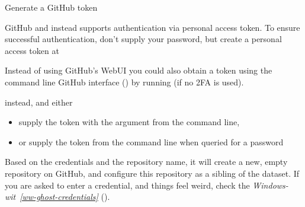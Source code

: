 \ignorespaces \begin{importantnote}[label={index-13}, before title={\thetcbcounter\ }, check odd page=true]{Generate a GitHub token}
\label{\detokenize{basics/101-130-yodaproject:index-13}}

\sphinxAtStartPar
GitHub  and instead supports authentication via personal access token.
To ensure successful authentication, don’t supply your password, but create a personal access token at %
\begin{footnote}\sphinxAtStartFootnote
Instead of using GitHub’s WebUI you could also obtain a token using the command line GitHub interface () by running  (if no 2FA is used).
%
\end{footnote} instead, and either
\begin{itemize}
\item {} 
\sphinxAtStartPar
supply the token with the argument  from the command line,

\item {} 
\sphinxAtStartPar
or supply the token from the command line when queried for a password

\end{itemize}


\end{importantnote}

\sphinxAtStartPar
Based on the credentials and the
repository name, it will create a new, empty repository on GitHub, and
configure this repository as a sibling of the dataset.
If you are asked to enter a credential, and things feel weird, check
the \textit{Windows-wit}~{\windowswiticoninline}\textit{\ref{ww-ghost-credentials}} {\hyperref[\detokenize{basics/101-130-yodaproject:ww-ghost-credentials}]{}} ().

